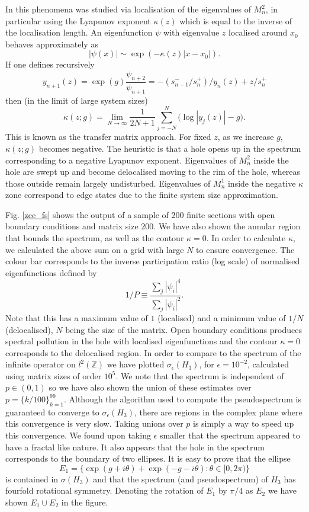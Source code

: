 \documentclass[a4paper,10pt]{article}
\begin{document}
\begin{example}
In \cite{amir2016non} this phenomena was studied via localisation of the eigenvalues of $M_n^{2}$, in particular using the Lyapunov exponent $\kappa(z)$ which is equal to the inverse of the localisation length. An eigenfunction $\psi$ with eigenvalue $z$ localised around $x_0$ behaves approximately as 
$$
\left|\psi(x)\right|\sim \exp({-\kappa(z)\left| x-x_0\right|}).
$$
If one defines recursively
$$
y_{n+1}(z)=\exp(g)\frac{\psi_{n+2}}{\psi_{n+1}}=-(s^{-}_{n-1}/s_n^+)/y_n(z)+z/s_n^+
$$
then (in the limit of large system sizes)
$$
\kappa(z;g)=\lim_{N\rightarrow\infty}\frac{1}{2N+1}\sum_{j=-N}^{N}\big(\log\left|y_j(z)\right|-g\big).
$$
This is known as the transfer matrix approach. %
 For fixed $z$, as we increase $g$, $\kappa(z;g)$ becomes negative. The heuristic is that a hole opens up in the spectrum corresponding to a negative Lyapunov exponent. Eigenvalues of $M_n^2$ inside the hole are swept up and become delocalised moving to the rim of the hole, whereas those outside remain largely undisturbed. Eigenvalues of $M_n^1$ inside the negative $\kappa$ zone correspond to edge states due to the finite system size approximation.

Fig. \ref{zee_fs} shows the output of a sample of $200$ finite sections with open boundary conditions and matrix size $200$. We have also shown the annular region that bounds the spectrum, as well as the contour $\kappa=0$. In order to calculate $\kappa$, we calculated the above sum on a grid with large $N$ to ensure convergence. The colour bar corresponds to the inverse participation ratio (log scale) of normalised eigenfunctions defined by
$$
1/P\equiv\frac{\sum_j\left|\psi_i\right|^4}{\sum_j\left|\psi_i\right|^2}.
$$
Note that this has a maximum value of $1$ (localised) and a minimum value of $1/N$ (delocalised), $N$ being the size of the matrix. Open boundary conditions produces spectral pollution in the hole with localised eigenfunctions and the contour $\kappa=0$ corresponds to the delocalised region. In order to compare to the spectrum of the infinite operator on $l^2(\mathbb{Z})$ we have plotted $\sigma_{\epsilon}(H_3)$, for $\epsilon=10^{-2}$, calculated using matrix sizes of order $10^5$. We note that the spectrum is independent of $p\in(0,1)$ so we have also shown the union of these estimates over $p=\{k/100\}_{k=1}^{99}$. Although the algorithm used to compute the pseudospectrum is guaranteed to converge to $\sigma_{\epsilon}(H_3)$, there are regions in the complex plane where this convergence is very slow. Taking unions over $p$ is simply a way to speed up this convergence. We found upon taking $\epsilon$ smaller that the spectrum appeared to have a fractal like nature. It also appears that the hole in the spectrum corresponds to the boundary of two ellipses. It is easy to prove that the ellipse
$$
E_1=\{\exp({g+i\theta})+\exp({-g-i\theta}):\theta\in[0,2\pi)\}
$$
is contained in $\sigma(H_3)$ and that the spectrum (and pseudospectrum) of $H_3$ has fourfold rotational symmetry. Denoting the rotation of $E_1$ by $\pi/4$ as $E_2$ we have shown $E_1\cup E_2$ in the figure.



\end{example}
\end{document}
